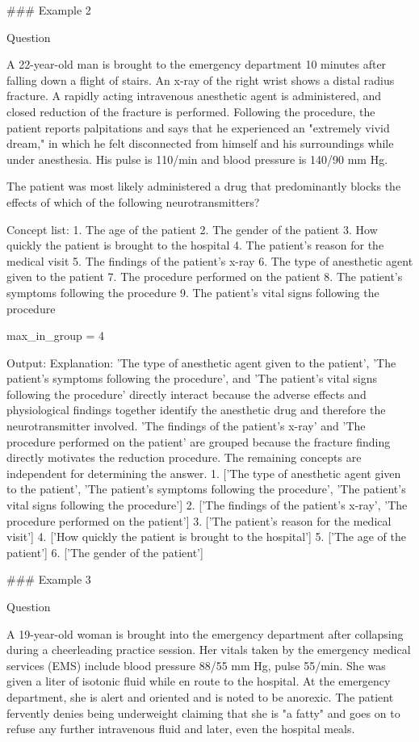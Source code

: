\begin{promptbox}
### Example 2

Question

A 22-year-old man is brought to the emergency department 10 minutes after falling down a flight of stairs. An x-ray of the right wrist shows a distal radius fracture. A rapidly acting intravenous anesthetic agent is administered, and closed reduction of the fracture is performed. Following the procedure, the patient reports palpitations and says that he experienced an "extremely vivid dream," in which he felt disconnected from himself and his surroundings while under anesthesia. His pulse is 110/min and blood pressure is 140/90 mm Hg.

The patient was most likely administered a drug that predominantly blocks the effects of which of the following neurotransmitters?

Concept list:
1. The age of the patient
2. The gender of the patient
3. How quickly the patient is brought to the hospital
4. The patient's reason for the medical visit
5. The findings of the patient's x-ray
6. The type of anesthetic agent given to the patient
7. The procedure performed on the patient
8. The patient's symptoms following the procedure
9. The patient's vital signs following the procedure

max_in_group = 4

Output:
Explanation: 'The type of anesthetic agent given to the patient', 'The patient's symptoms following the procedure', and 'The patient's vital signs following the procedure' directly interact because the adverse effects and physiological findings together identify the anesthetic drug and therefore the neurotransmitter involved. 'The findings of the patient's x-ray' and 'The procedure performed on the patient' are grouped because the fracture finding directly motivates the reduction procedure. The remaining concepts are independent for determining the answer.
1. ['The type of anesthetic agent given to the patient', 'The patient's symptoms following the procedure', 'The patient's vital signs following the procedure']
2. ['The findings of the patient's x-ray', 'The procedure performed on the patient']
3. ['The patient's reason for the medical visit']
4. ['How quickly the patient is brought to the hospital']
5. ['The age of the patient']
6. ['The gender of the patient']

### Example 3

Question

A 19-year-old woman is brought into the emergency department after collapsing during a cheerleading practice session. Her vitals taken by the emergency medical services (EMS) include blood pressure 88/55 mm Hg, pulse 55/min. She was given a liter of isotonic fluid while en route to the hospital. At the emergency department, she is alert and oriented and is noted to be anorexic. The patient fervently denies being underweight claiming that she is "a fatty" and goes on to refuse any further intravenous fluid and later, even the hospital meals.


\end{promptbox}
